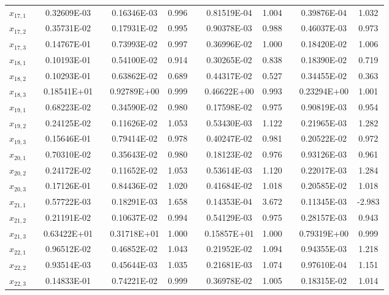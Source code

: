 \begin{table}[t]
\begin{center}
\begin{tabular}{ @{}cccc  cccc  cccc @{} }
$ x_{17,1}$  && 0.32609E-03 &&  0.16346E-03 &   0.996  && 0.81519E-04 &   1.004 && 0.39876E-04  &   1.032 \\
$ x_{17,2}$  && 0.35731E-02 &&  0.17931E-02 &   0.995  && 0.90378E-03 &   0.988 && 0.46037E-03  &   0.973 \\
$ x_{17,3}$  && 0.14767E-01 &&  0.73993E-02 &   0.997  && 0.36996E-02 &   1.000 && 0.18420E-02  &   1.006 \\
$ x_{18,1}$  && 0.10193E-01 &&  0.54100E-02 &   0.914  && 0.30265E-02 &   0.838 && 0.18390E-02  &   0.719 \\
$ x_{18,2}$  && 0.10293E-01 &&  0.63862E-02 &   0.689  && 0.44317E-02 &   0.527 && 0.34455E-02  &   0.363 \\
$ x_{18,3}$  && 0.18541E+01 &&  0.92789E+00 &   0.999  && 0.46622E+00 &   0.993 && 0.23294E+00  &   1.001 \\
$ x_{19,1}$  && 0.68223E-02 &&  0.34590E-02 &   0.980  && 0.17598E-02 &   0.975 && 0.90819E-03  &   0.954 \\
$ x_{19,2}$  && 0.24125E-02 &&  0.11626E-02 &   1.053  && 0.53430E-03 &   1.122 && 0.21965E-03  &   1.282 \\
$ x_{19,3}$  && 0.15646E-01 &&  0.79414E-02 &   0.978  && 0.40247E-02 &   0.981 && 0.20522E-02  &   0.972 \\
$ x_{20,1}$  && 0.70310E-02 &&  0.35643E-02 &   0.980  && 0.18123E-02 &   0.976 && 0.93126E-03  &   0.961 \\
$ x_{20,2}$  && 0.24172E-02 &&  0.11652E-02 &   1.053  && 0.53614E-03 &   1.120 && 0.22017E-03  &   1.284 \\
$ x_{20,3}$  && 0.17126E-01 &&  0.84436E-02 &   1.020  && 0.41684E-02 &   1.018 && 0.20585E-02  &   1.018 \\
$ x_{21,1}$  && 0.57722E-03 &&  0.18291E-03 &   1.658  && 0.14353E-04 &   3.672 && 0.11345E-03  &  -2.983 \\
$ x_{21,2}$  && 0.21191E-02 &&  0.10637E-02 &   0.994  && 0.54129E-03 &   0.975 && 0.28157E-03  &   0.943 \\
$ x_{21,3}$  && 0.63422E+01 &&  0.31718E+01 &   1.000  && 0.15857E+01 &   1.000 && 0.79319E+00  &   0.999 \\
$ x_{22,1}$  && 0.96512E-02 &&  0.46852E-02 &   1.043  && 0.21952E-02 &   1.094 && 0.94355E-03  &   1.218 \\
$ x_{22,2}$  && 0.93514E-03 &&  0.45644E-03 &   1.035  && 0.21681E-03 &   1.074 && 0.97610E-04  &   1.151 \\
$ x_{22,3}$  && 0.14833E-01 &&  0.74221E-02 &   0.999  && 0.36978E-02 &   1.005 && 0.18315E-02  &   1.014 \\

\end{tabular}
\end{center}
\end{table}
